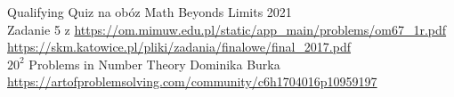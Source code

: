 
 Qualifying Quiz na obóz Math Beyonds Limits 2021\\
 Zadanie 5 z \url{https://om.mimuw.edu.pl/static/app_main/problems/om67_1r.pdf}\\
 \url{https://skm.katowice.pl/pliki/zadania/finalowe/final_2017.pdf}\\
 $20^2$ Problems in Number Theory Dominika Burka\\
 \url{https://artofproblemsolving.com/community/c6h1704016p10959197}